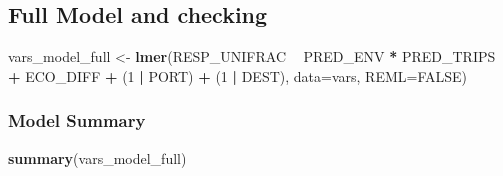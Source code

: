 \documentclass[]{article}
\newenvironment{Shaded}{\begin{snugshade}}{\end{snugshade}}
\newcommand{\KeywordTok}[1]{\textcolor[rgb]{0.13,0.29,0.53}{\textbf{#1}}}
\newcommand{\DataTypeTok}[1]{\textcolor[rgb]{0.13,0.29,0.53}{#1}}
\newcommand{\DecValTok}[1]{\textcolor[rgb]{0.00,0.00,0.81}{#1}}
\newcommand{\StringTok}[1]{\textcolor[rgb]{0.31,0.60,0.02}{#1}}
\newcommand{\CommentTok}[1]{\textcolor[rgb]{0.56,0.35,0.01}{\textit{#1}}}
\newcommand{\OtherTok}[1]{\textcolor[rgb]{0.56,0.35,0.01}{#1}}
\newcommand{\OperatorTok}[1]{\textcolor[rgb]{0.81,0.36,0.00}{\textbf{#1}}}
\newcommand{\NormalTok}[1]{#1}
\begin{document}
\begin{Shaded}
\end{Shaded}

\subsection{Full Model and checking}\label{full-model-and-checking}

\begin{Shaded}
\begin{Highlighting}[]
\NormalTok{vars_model_full <-}\StringTok{ }\KeywordTok{lmer}\NormalTok{(RESP_UNIFRAC }\OperatorTok{~}\StringTok{ }\NormalTok{PRED_ENV }\OperatorTok{*}\StringTok{ }\NormalTok{PRED_TRIPS }\OperatorTok{+}\StringTok{ }\NormalTok{ECO_DIFF }\OperatorTok{+}\StringTok{ }\NormalTok{(}\DecValTok{1} \OperatorTok{|}\StringTok{ }\NormalTok{PORT) }\OperatorTok{+}\StringTok{ }\NormalTok{(}\DecValTok{1} \OperatorTok{|}\StringTok{ }\NormalTok{DEST), }\DataTypeTok{data=}\NormalTok{vars, }\DataTypeTok{REML=}\OtherTok{FALSE}\NormalTok{)}
\end{Highlighting}
\end{Shaded}

\subsubsection{Model Summary}\label{model-summary}

\begin{Shaded}
\begin{Highlighting}[]
\KeywordTok{summary}\NormalTok{(vars_model_full)}
\end{Highlighting}
\end{Shaded}
\end{document}
